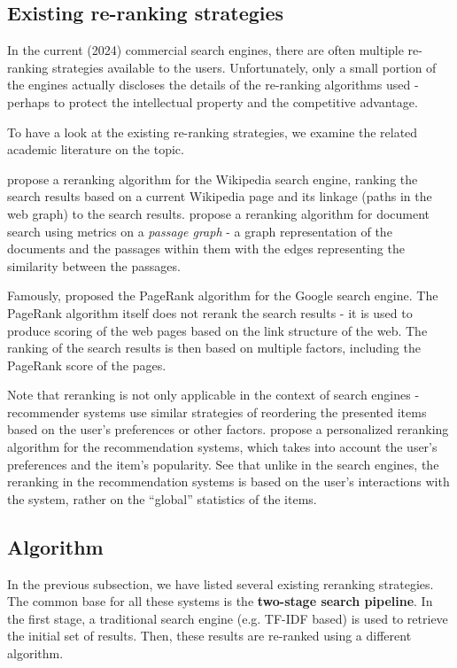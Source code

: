 \subsection{Existing re-ranking strategies}

In the current (2024) commercial search engines, there are often multiple re-ranking strategies available to the users.
Unfortunately, only a small portion of the engines actually discloses the details of the re-ranking algorithms used - perhaps to protect the intellectual property and the competitive advantage.

To have a look at the existing re-ranking strategies, we examine the related academic literature on the topic.

\cite{wikipedia-rerank} propose a reranking algorithm for the Wikipedia search engine, ranking the search results based on a current Wikipedia page and its linkage (paths in the web graph) to the search results.
\cite{passage-graph} propose a reranking algorithm for document search using metrics on a \textit{passage graph} - a graph representation of the documents and the passages within them
with the edges representing the similarity between the passages.

Famously, \cite{pagerank} proposed the PageRank algorithm for the Google search engine.
The PageRank algorithm itself does not rerank the search results - it is used to produce scoring of the web pages based on the link structure of the web.
The ranking of the search results is then based on multiple factors, including the PageRank score of the pages.

Note that reranking is not only applicable in the context of search engines - recommender systems use similar strategies of reordering the presented items based on the user's preferences or other factors.
\cite{personalized-reranking} propose a personalized reranking algorithm for the recommendation systems, which takes into account the user's preferences and the item's popularity.
See that unlike in the search engines, the reranking in the recommendation systems is based on the user's interactions with the system, rather on the ``global'' statistics of the items.

\subsection{Algorithm}\label{reranking-algorithm}

In the previous subsection, we have listed several existing reranking strategies.
The common base for all these systems is the \textbf{two-stage search pipeline}. 
In the first stage, a traditional search engine (e.g. TF-IDF based) is used to retrieve the initial set of results. 
Then, these results are re-ranked using a different algorithm. 

